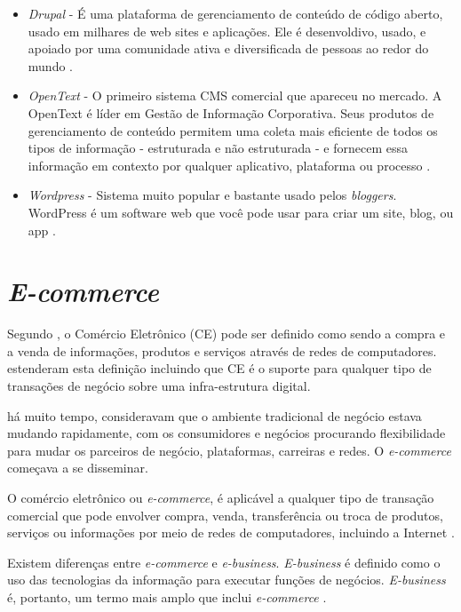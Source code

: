\documentclass[a4paper,12pt]{monografia}
\begin{document}
\begin{itemize}
\item \textit{Drupal} - É uma plataforma de gerenciamento de conteúdo de código aberto, usado em milhares de web sites e aplicações. Ele é desenvoldivo, usado, e apoiado por uma comunidade ativa e diversificada de pessoas ao redor do mundo \cite{drupal}.

\item \textit{OpenText} \citeyear{opentext} - O primeiro sistema CMS comercial que apareceu no mercado. A OpenText é líder em Gestão de Informação Corporativa. Seus produtos de gerenciamento de conteúdo permitem uma coleta mais eficiente de todos os tipos de informação - estruturada e não estruturada - e fornecem essa informação em contexto por qualquer aplicativo, plataforma ou processo \cite{opentext}.

\item \textit{Wordpress} - Sistema muito popular e bastante usado pelos \textit{bloggers}. WordPress é um software web que você pode usar para criar um site, blog, ou app \cite{wordpress}.
\end{itemize}


\section{\textit{E-commerce}} %
\label{sec:e_commerce} 

Segundo , o Comércio Eletrônico (CE) pode ser definido como sendo a compra e a venda de informações, produtos e serviços através de redes de computadores.  estenderam esta definição incluindo que CE é o suporte para qualquer tipo de transações de negócio sobre uma infra-estrutura digital.

 há muito tempo, consideravam que o ambiente tradicional de negócio estava mudando rapidamente, com os consumidores e negócios procurando flexibilidade para mudar os parceiros de negócio, plataformas, carreiras e redes. O \textit{e-commerce} começava a se disseminar.

O comércio eletrônico ou \textit{e-commerce}, é aplicável a qualquer tipo de transação comercial que pode envolver compra, venda, transferência ou troca de produtos, serviços ou informações por meio de redes de computadores, incluindo a Internet \cite{turban}.

Existem diferenças entre \textit{e-commerce} e \textit{e-business}. \textit{E-business} é definido como o uso das tecnologias da informação para executar funções de negócios. \textit{E-business} é, portanto, um termo mais amplo que inclui \textit{e-commerce} \cite{gordon}. 
\end{document}
